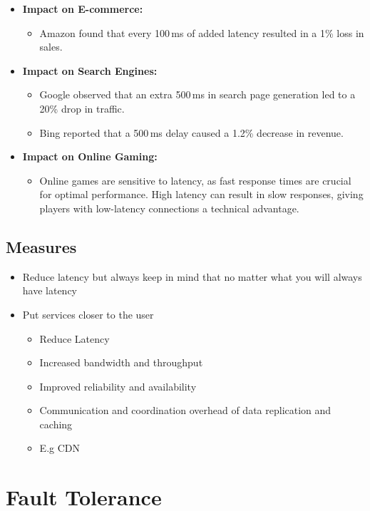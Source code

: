 \documentclass[../Main.tex]{subfiles}
\begin{document}
\begin{itemize}
    \item \textbf{Impact on E-commerce:}
    \begin{itemize}
        \item Amazon found that every 100\,ms of added latency resulted in a 1\% loss in sales.
    \end{itemize}
    \item \textbf{Impact on Search Engines:}
    \begin{itemize}
        \item Google observed that an extra 500\,ms in search page generation led to a 20\% drop in traffic.
        \item Bing reported that a 500\,ms delay caused a 1.2\% decrease in revenue.
    \end{itemize}
    \item \textbf{Impact on Online Gaming:}
    \begin{itemize}
        \item Online games are sensitive to latency, as fast response times are crucial for optimal performance.
        High latency can result in slow responses, giving players with low-latency connections a technical advantage.
    \end{itemize}
\end{itemize}

\subsection{Measures}
\begin{itemize}
    \item Reduce latency but always keep in mind that no matter what you will always have latency
    \item Put services closer to the user 
    \begin{itemize}
        \item Reduce Latency
        \item Increased bandwidth and throughput
        \item Improved reliability and availability
        \item Communication and coordination overhead of data replication and caching
        \item E.g CDN
    \end{itemize}
\end{itemize}

\section{Fault Tolerance}
\end{document}
